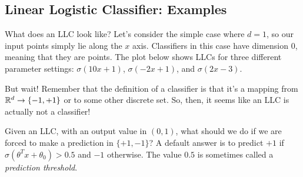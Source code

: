 
\subsection{Linear Logistic Classifier: Examples}

What does an LLC look like?   Let's consider the
simple case where $d = 1$, so our input points simply lie along the
$x$ axis.  Classifiers in this case have dimension $0$, meaning that
they are points.
The plot below shows LLCs for three different parameter
settings: $\sigma(10x + 1)$, $\sigma(-2x + 1)$, and $\sigma(2x - 3).$
\begin{center}
\end{center}

But wait!  Remember that the definition of a classifier is that it's a mapping from $\mathbb{R}^d
  \rightarrow \{-1, +1\}$ or to some other discrete set.  So, then, it
seems like an LLC is actually not a classifier!

Given an LLC, with an output value in $(0, 1)$, what should we do if
we are forced to make a prediction in $\{+1, -1\}$?  A default answer
is to predict $+1$ if $\sigma(\theta^T x + \theta_0) > 0.5$ and $-1$
otherwise.  The value $0.5$ is sometimes called a {\em prediction
    threshold}.

